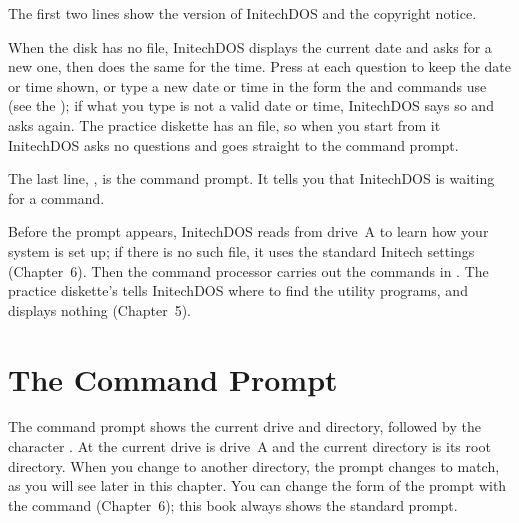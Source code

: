 
The first two lines show the version of
InitechDOS and the copyright notice.

When the disk has no  file,
InitechDOS displays the current date and asks for a new one, then does the
same for the time.  Press  at each question to keep the date or
time shown, or type a new date or time in the form the  and
 commands use (see the ); if what
you type is not a valid date or time, InitechDOS says so and asks again.  The practice diskette has an
 file, so when you start from it InitechDOS asks no
questions and goes straight to the command prompt.

The last line, , is the command
prompt.  It tells you that InitechDOS is waiting for a command.

Before the prompt appears, InitechDOS reads
 from drive~A to learn how your system is set up; if there
is no such file, it uses the standard Initech settings (Chapter~6).  Then
the command processor carries out the commands in .  The
practice diskette's  tells InitechDOS where to find the
utility programs, and displays nothing (Chapter~5).

\section{The Command Prompt}
The command prompt shows the current drive and directory, followed by the
character \file{>}.  At  the current drive is drive~A and the
current directory is its root directory.  When you change to another
directory, the prompt changes to match, as you will see later in this
chapter.  You can change the form of the prompt with the 
command (Chapter~6); this book always shows the standard prompt.

